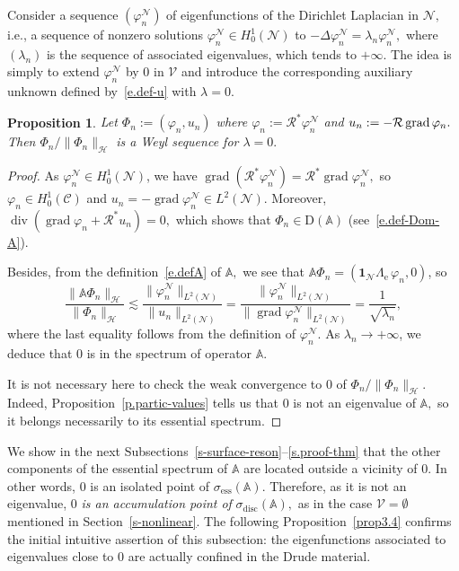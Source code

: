 \documentclass[11pt]{article}
\newtheorem{prop}[theo]{Proposition}
\theoremstyle{definition}
\numberwithin{equation}{section}
\numberwithin{figure}{section}
\numberwithin{table}{section}
\DeclareMathOperator{\Div}{div}
\DeclareMathOperator{\grad}{grad}
\DeclareMathOperator{\ess}{ess}
\DeclareMathOperator{\disc}{disc}
\newcommand{\calC}{\mathcal{C}}
\newcommand{\calH}{\mathcal{H}}
\newcommand{\calN}{\mathcal{N}}
\newcommand{\calR}{\mathcal{R}}
\newcommand{\calV}{\mathcal{V}}
\newcommand{\bbA}{\mathbb{A}}
\newcommand{\rmD}{{\mathrm{D}}}
\newcommand{\Un}{\boldsymbol{1}}
\newcommand{\Le}{{\Lambda_{\mathrm{e}}}}
\begin{document}
Consider a sequence $(\varphi_n^\calN)$ of eigenfunctions of the Dirichlet Laplacian in $\calN,$ i.e., a sequence of nonzero solutions $\varphi_n^\calN \in H^1_0(\calN)$ to $-\Delta \varphi_n^\calN = \lambda_n \varphi_n^\calN,$ where $(\lambda_n)$ is the sequence of associated eigenvalues, which tends to $+\infty.$ The idea is simply to extend $\varphi_n^\calN$ by 0 in $\calV$ and introduce the corresponding auxiliary unknown defined by~\eqref{e.def-u} with $\lambda=0.$
\pagebreak


\begin{prop}\label{p-Weyl-bulk}
Let $\Phi_n := (\varphi_n,u_n)$ where $\varphi_n := \calR^* \varphi_n^\calN$ and $u_n :=\linebreak- \calR \grad \varphi_n.$ Then $\Phi_n/\|\Phi_n\|_\calH$ is a Weyl sequence for $\lambda = 0.$
\end{prop}


\begin{proof}
As $\varphi_n^\calN \in H_0^1(\calN)$, we have $\grad (\calR^* \varphi_n^\calN) = \calR^* \grad \varphi_n^\calN,$ so $\varphi_n \in H_0^1(\calC)$ and $u_n = - \grad \varphi_n^\calN \in L^2(\calN)$. Moreover, $\Div (\grad \varphi_n + \calR^* u_n) = 0,$ which shows that $\Phi_n \in \rmD(\bbA)$ (see~\eqref{e.def-Dom-A}).

Besides, from the definition~\eqref{e.defA} of $\bbA,$ we see that $\bbA \Phi_n = (\Un_\calN \Le \, \varphi_n,0)$, so
\[
\frac{\| \bbA \Phi_n \|_\calH}{\| \Phi_n \|_\calH}
\lesssim \frac{ \| \varphi_n^\calN \|_{L^2(\calN)} }{\| u_n \|_{L^2(\calN)}} = \frac{ \| \varphi_n^\calN \|_{L^2(\calN)} }{\| \grad \varphi_n^\calN \|_{L^2(\calN)}} = \frac{1}{\sqrt{\lambda_n}},
\]
where the last equality follows from the definition of $\varphi_n^\calN.$ As $\lambda_n \to +\infty$, we deduce that $0$ is in the spectrum of operator $\bbA$.

It is not necessary here to check the weak convergence to 0 of $\Phi_n/\|\Phi_n\|_\calH.$ Indeed, Proposition~\ref{p.partic-values} tells us that $0$ is not an eigenvalue of $\bbA,$ so it belongs necessarily to its essential spectrum.
\end{proof}

We show in the next Subsections~\ref{s-surface-reson}--\ref{s.proof-thm} that the other components of the essential spectrum of $\bbA$ are located outside a vicinity of $0.$ In other words, $0$ is an isolated point of $\sigma_{\ess}(\bbA).$ Therefore, as it is not an eigenvalue, $0$ \emph{is an accumulation point of} $\sigma_{\disc}(\bbA),$ as in the case $\calV = \emptyset$ mentioned in Section~\ref{s-nonlinear}. The following Proposition~\ref{prop3.4} confirms the initial intuitive assertion of this subsection: the eigenfunctions associated to eigenvalues close to 0 are actually confined in the Drude material.
\end{document}
